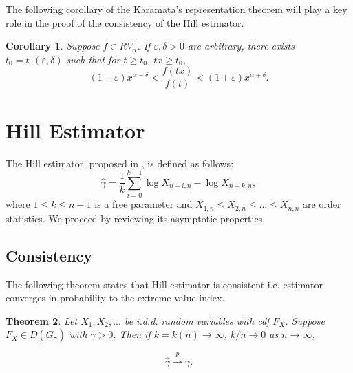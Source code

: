 \documentclass[english,12pt,a4paper,pdftex,sci,utf8]{aaltothesis} %
\newtheorem{theorem}{Theorem}[section]
\newtheorem{corollary}[theorem]{Corollary}
\begin{document}
The following corollary \cite{potter} of the Karamata’s representation theorem will play a key role in the proof of the consistency of the Hill estimator. 

\begin{corollary}
Suppose $f \in RV_{\alpha}$. If $\varepsilon, \delta>0$ are arbitrary, there exists $t_0=t_0(\varepsilon, \delta)$ such that for $t\geq t_0$, $tx \geq t_0$,
\begin{equation*}
(1-\varepsilon)x^{\alpha-\delta}<\frac{f(tx)}{f(t)}<(1+\varepsilon)x^{\alpha+\delta}.
\end{equation*}
\label{inequality}
\end{corollary}



\clearpage

\section{Hill Estimator}
\label{hillEst}


The Hill estimator, proposed in \cite{hill}, is defined as follows:
\begin{equation*}
\hat{\gamma} = \frac{1}{k} \sum_{i=0}^{k-1} \log X_{n-i,n} - \log X_{n-k,n}, 
\end{equation*}
where $1 \leq k \leq n-1$ is a free parameter and $X_{1,n} \leq X_{2,n} \leq ...  \leq X_{n,n}$ are order statistics. We proceed by reviewing its asymptotic properties.

\subsection{Consistency}

The following theorem states that Hill estimator is consistent i.e. estimator converges in probability to the extreme value index. \cite{hill}


\begin{theorem}
Let $X_1, X_2,...$ be i.d.d. random variables with cdf $F_X$. Suppose $F_X \in D(G_{\gamma})$ with $\gamma > 0$. Then if $k=k(n)  \rightarrow \infty$, $k/n \rightarrow 0$ as $n \rightarrow \infty$,

\begin{equation*}
\hat{\gamma} \xrightarrow{p} \gamma.
\end{equation*}
\label{hillcons}
\end{theorem}
\end{document}
